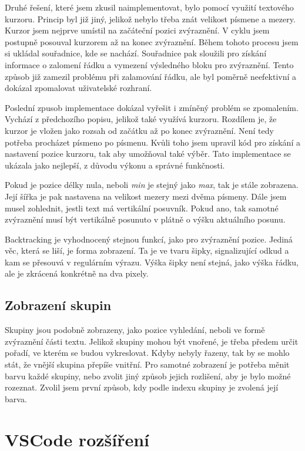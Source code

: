 Druhé řešení, které jsem zkusil naimplementovat, bylo pomocí využití textového kurzoru.
Princip byl již jiný, jelikož nebylo třeba znát velikost písmene a mezery.
Kurzor jsem nejprve umístil na začáteční pozici zvýraznění. 
V cyklu jsem postupně posouval kurzorem až na konec zvýraznění.
Během tohoto procesu jsem si ukládal souřadnice, kde se nachází.
Souřadnice pak sloužili pro získání informace o zalomení řádku a vymezení výsledného bloku pro zvýraznění.
Tento způsob již zamezil problému při zalamování řádku, ale byl poměrně neefektivní a dokázal zpomalovat uživatelské rozhraní.

Poslední zpusob implementace dokázal vyřešit i zmíněný problém se zpomalením.
Vychází z předchozího popisu, jelikož také využívá kurzoru.
Rozdílem je, že kurzor je vložen jako rozsah od začátku až po konec zvýraznění.
Není tedy potřeba procházet písmeno po písmenu.
Kvůli toho jsem upravil kód pro získání a nastavení pozice kurzoru, tak aby umožňoval také výběr.
Tato implementace se ukázala jako nejlepší, z důvodu výkonu a správné funkčnosti.

Pokud je pozice délky nula, neboli \textit{min} je stejný jako \textit{max}, tak je stále zobrazena. 
Její šířka je pak nastavena na velikost mezery mezi dvěma písmeny. 
Dále jsem musel zohlednit, jestli text má vertikální posuvník. 
Pokud ano, tak samotné zvýraznění musí být vertikálně posunuto v plátně o výšku aktuálního posunu.

Backtracking je vyhodnocený stejnou funkcí, jako pro zvýraznění pozice.
Jediná věc, která se liší, je forma zobrazení. 
Ta je ve tvaru šipky, signalizující odkud a kam se přesouvá v regulárním výrazu.
Výška šipky není stejná, jako výška řádku, ale je zkrácená konkrétně na dva pixely.

\subsection*{Zobrazení skupin}

Skupiny jsou podobně zobrazeny, jako pozice vyhledání, neboli ve formě zvýraznění části textu.
Jelikož skupiny mohou být vnořené, je třeba předem určit pořadí, ve kterém se budou vykreslovat.
Kdyby nebyly řazeny, tak by se mohlo stát, že vnější skupina přepíše vnitřní.
Pro samotné zobrazení je potřeba měnit barvu každé skupiny, nebo zvolit jiný způsob jejich rozlišení, aby je bylo možné rozeznat.
Zvolil jsem první způsob, kdy podle indexu skupiny je zvolená její barva.

\section{VSCode rozšíření}

